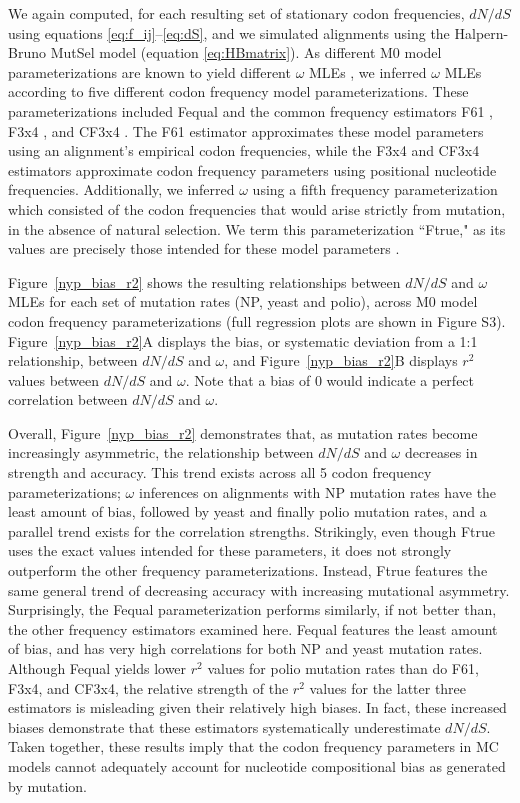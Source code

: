 \documentclass{pnastwo}
\begin{document}
\begin{article}
We again computed, for each resulting set of stationary codon frequencies, $dN/dS$ using equations \eqref{eq:f_ij}--\eqref{eq:dS}, and we simulated alignments using the Halpern-Bruno MutSel model (equation \eqref{eq:HBmatrix}). As different M0 model parameterizations are known to yield different $\omega$ MLEs \cite{Yang2006,ZhangYu2006,Pond2010}, we inferred $\omega$ MLEs according to five different codon frequency model parameterizations. These parameterizations included Fequal \cite{Yang2006} and the common frequency estimators F61 \cite{GoldmanYang1994}, F3x4 \cite{MuseGaut1994}, and CF3x4 \cite{Pond2010}. The F61 estimator approximates these model parameters using an alignment's empirical codon frequencies, while the F3x4 and CF3x4 estimators approximate codon frequency parameters using positional nucleotide frequencies. Additionally, we inferred $\omega$ using a fifth frequency parameterization which consisted of the codon frequencies that would arise strictly from mutation, in the absence of natural selection. We term this parameterization ``Ftrue," as its values are precisely those intended for these model parameters \cite{GoldmanYang1994,MuseGaut1994,YN00,Yang2006}.


Figure~\ref{nyp_bias_r2} shows the resulting relationships between $dN/dS$ and $\omega$ MLEs for each set of mutation rates (NP, yeast and polio), across M0 model codon frequency parameterizations (full regression plots are shown in Figure S3). Figure~\ref{nyp_bias_r2}A displays the bias, or systematic deviation from a 1:1 relationship, between $dN/dS$ and $\omega$, and Figure~\ref{nyp_bias_r2}B displays $r^2$ values between $dN/dS$ and $\omega$. Note that a bias of 0 would indicate a perfect correlation between $dN/dS$ and $\omega$. 

Overall, Figure~\ref{nyp_bias_r2} demonstrates that, as mutation rates become increasingly asymmetric, the relationship between $dN/dS$ and $\omega$ decreases in strength and accuracy. This trend exists across all 5 codon frequency parameterizations; $\omega$ inferences on alignments with NP mutation rates have the least amount of bias, followed by yeast and finally polio mutation rates, and a parallel trend exists for the correlation strengths. Strikingly, even though Ftrue uses the exact values intended for these parameters, it does not strongly outperform the other frequency parameterizations. Instead, Ftrue features the same general trend of decreasing accuracy with increasing mutational asymmetry. Surprisingly, the Fequal parameterization performs similarly, if not better than, the other frequency estimators examined here. Fequal features the least amount of bias, and has very high correlations for both NP and yeast mutation rates. Although Fequal yields lower $r^2$ values for polio mutation rates than do F61, F3x4, and CF3x4, the relative strength of the $r^2$ values for the latter three estimators is misleading given their relatively high biases. In fact, these increased biases demonstrate that these estimators systematically underestimate $dN/dS$. Taken together, these results imply that the codon frequency parameters in MC models cannot adequately account for nucleotide compositional bias as generated by mutation. 


\end{article}
\end{document}
